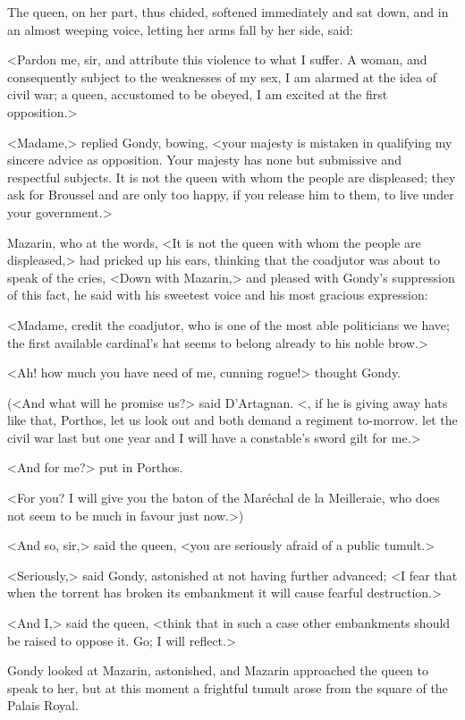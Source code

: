 The queen, on her part, thus chided, softened immediately and sat down, and in an almost weeping voice, letting her arms fall by her side, said:

<Pardon me, sir, and attribute this violence to what I suffer. A woman, and consequently subject to the weaknesses of my sex, I am alarmed at the idea of civil war; a queen, accustomed to be obeyed, I am excited at the first opposition.>

<Madame,> replied Gondy, bowing, <your majesty is mistaken in qualifying my sincere advice as opposition. Your majesty has none but submissive and respectful subjects. It is not the queen with whom the people are displeased; they ask for Broussel and are only too happy, if you release him to them, to live under your government.>

Mazarin, who at the words, <It is not the queen with whom the people are displeased,> had pricked up his ears, thinking that the coadjutor was about to speak of the cries, <Down with Mazarin,> and pleased with Gondy's suppression of this fact, he said with his sweetest voice and his most gracious expression:

<Madame, credit the coadjutor, who is one of the most able politicians we have; the first available cardinal's hat seems to belong already to his noble brow.>

<Ah! how much you have need of me, cunning rogue!> thought Gondy.

(<And what will he promise us?> said D'Artagnan. <, if he is giving away hats like that, Porthos, let us look out and both demand a regiment to-morrow.  let the civil war last but one year and I will have a constable's sword gilt for me.>

<And for me?> put in Porthos.

<For you? I will give you the baton of the Maréchal de la Meilleraie, who does not seem to be much in favour just now.>)

<And so, sir,> said the queen, <you are seriously afraid of a public tumult.>

<Seriously,> said Gondy, astonished at not having further advanced; <I fear that when the torrent has broken its embankment it will cause fearful destruction.>

<And I,> said the queen, <think that in such a case other embankments should be raised to oppose it. Go; I will reflect.>

Gondy looked at Mazarin, astonished, and Mazarin approached the queen to speak to her, but at this moment a frightful tumult arose from the square of the Palais Royal.

